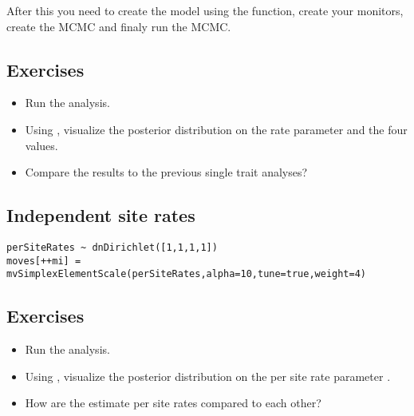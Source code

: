 After this you need to create the model using the  function, create your monitors, create the MCMC and finaly run the MCMC.


\subsection*{Exercises}

\begin{itemize}
\item
Run the analysis.
\item
Using , visualize the posterior distribution on the rate parameter  and the four  values.
\item 
Compare the results to the previous single trait analyses?
\end{itemize}

\vspace{5cm}



\subsection{Independent site rates}

{\tt \small \begin{snugshade*}
\begin{lstlisting}
perSiteRates ~ dnDirichlet([1,1,1,1])
moves[++mi] = mvSimplexElementScale(perSiteRates,alpha=10,tune=true,weight=4)
\end{lstlisting}
\end{snugshade*}}


\subsection*{Exercises}

\begin{itemize}
\item
Run the analysis.
\item
Using , visualize the posterior distribution on the per site rate parameter .
\item 
How are the estimate per site rates compared to each other?
\end{itemize}

\vspace{5cm}


